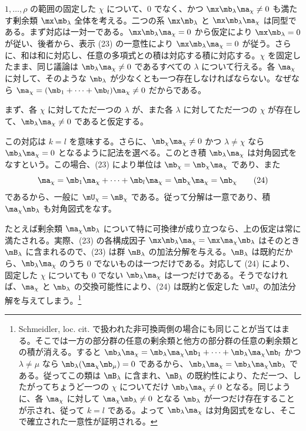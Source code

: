 \documentclass[11pt]{article}
\begin{document}
$1,
\ldots,\rho$ の範囲の固定した $\chi$ について、0 でなく、かつ $\mx\mb_\lambda\ma_\chi\ne0$ も満たす剰余類 $\mx\mb_\lambda$ 全体を考える。二つの系 $\mx\mb_\lambda$ と $\mx\mb_\lambda\ma_\chi$ は同型である。まず対応は一対一である。$\mx\mb_\lambda\ma_\chi=0$ から仮定により $\mx\mb_\lambda=0$ が従い、後者から、表示 (23) の一意性により $\mx\mb_\lambda\ma_\chi=0$ が従う。さらに、和は和に対応し、任意の多項式との積は対応する積に対応する。$\chi$ を固定したまま、同じ議論は $\mb_\lambda\ma_\chi\ne0$ であるすべての $\lambda$ について行える。各 $\ma_\chi$ に対して、そのような $\mb_\lambda$ が少なくとも一つ存在しなければならない。なぜなら $\ma_\chi=(\mb_1+
\cdots+\mb_l)\ma_\chi\ne0$ だからである。

まず、各 $\chi$ に対してただ一つの $\lambda$ が、また各 $\lambda$ に対してただ一つの $\chi$ が存在して、$\mb_\lambda\ma_\chi\ne0$ であると仮定する。

この対応は $k=l$ を意味する。さらに、$\mb_\chi\ma_\chi\ne0$ かつ $\lambda\ne\chi$ なら $\mb_\lambda\ma_\chi=0$ となるように記法を選べる。このとき積 $\mb_\lambda\ma_\chi$ は対角図式をなすという。この場合、(23) により単位は $\mb_\chi=\mb_\chi\ma_\chi$ であり、また
\begin{equation}
 \ma_\chi=\mb_1\ma_\chi+\cdots+\mb_l\ma_\chi=\mb_\chi\ma_\chi=\mb_\chi
\tag{24}
\end{equation}
であるから、一般に $\mU_\chi=\mB_\chi$ である。従って分解は一意であり、積 $\ma_\chi\mb_\lambda$ も対角図式をなす。

たとえば剰余類 $\ma_\chi\mb_\lambda$ について特に可換律が成り立つなら、上の仮定は常に満たされる。実際、(23) の各構成因子 $\mx\mb_\lambda\ma_\chi=\mx\ma_\chi\mb_\lambda$ はそのとき $\mB_\lambda$ に含まれるので、(23) は群 $\mB_\lambda$ の加法分解を与える。$\mB_\lambda$ は既約だから、$\mb_\lambda\ma_\chi$ のうち 0 でないものは一つだけである。対応して (24) により、固定した $\chi$ についても 0 でない $\mb_\lambda\ma_\chi$ は一つだけである。そうでなければ、$\ma_\chi$ と $\mb_\lambda$ の交換可能性により、(24) は既約と仮定した $\mU_\chi$ の加法分解を与えてしまう。\footnote{Schmeidler, loc. cit. で扱われた非可換両側の場合にも同じことが当てはまる。そこでは一方の部分群の任意の剰余類と他方の部分群の任意の剰余類との積が消える。すると $\mb_\lambda\ma_\chi=\mb_\lambda\ma_\chi\mb_1+
\cdots+\mb_\lambda\ma_\chi\mb_l$ かつ $\lambda\ne\mu$ なら $\mb_\lambda(\ma_\chi\mb_\mu)=0$ であるから、$\mb_\lambda\ma_\chi=\mb_\lambda\ma_\chi\mb_\lambda$ である。従ってこの類は $\mB_\lambda$ に含まれ、$\mB_\lambda$ の既約性により、ただ一つ、したがってちょうど一つの $\chi$ についてだけ $\mb_\lambda\ma_\chi\ne0$ となる。同じように、各 $\ma_\chi$ に対して $\ma_\chi\mb_\lambda\ne0$ となる $\mb_\lambda$ が一つだけ存在することが示され、従って $k=l$ である。よって $\mb_\lambda\ma_\chi$ は対角図式をなし、そこで確立された一意性が証明される。}
\end{document}
